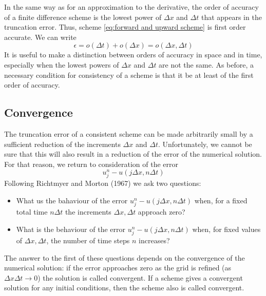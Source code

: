 In the same way as for an approximation to the derivative, the order of accuracy of a finite difference scheme is the lowest power of $\Delta x$ and $\Delta t$ that appears in the truncation error. Thus, scheme \ref{eq:forward and upward scheme} is first order accurate. We can write
$$\epsilon=o(\Delta t)+o(\Delta x)=o(\Delta x,\Delta t)$$
It is useful to make a distinction between orders of accuracy in space and in time, especially when the lowest powers of $\Delta x$ and $\Delta t$ are not the same. As before, a necessary condition for consistency of a scheme is that it be at least of the first order of accuracy.
\subsection{Convergence}
The truncation error of a consistent scheme can be made arbitrarily small by a sufficient reduction of the increments $\Delta x$ and $\Delta t$. Unfortunately, we cannot be sure that this will also result in a reduction of the error of the numerical solution. For that reason, we return to consideration of the error
$$u_j^n-u(j\Delta x,n\Delta t)$$
Following Richtmyer and Morton (1967) we ask two questions:
\begin{itemize}
	\item What us the bahaviour of the error $u_j^n-u(j\Delta x, n\Delta t)$ when, for a fixed total time $n\Delta t$ the increments $\Delta x, \Delta t$ approach zero?
	\item What is the behaviour of the error $u_j^n-u(j\Delta x, n\Delta t)$ when, for fixed values of $\Delta x, \Delta t$, the number of time steps $n$ increases?
\end{itemize}

The answer to the first of these questions depends on the convergence of the numerical solution: if the error approaches zero as the grid is refined (as $\Delta x\Delta t\rightarrow 0$) the solution is called convergent. If a scheme gives a convergent solution for any initial conditions, then the scheme also is called convergent.

